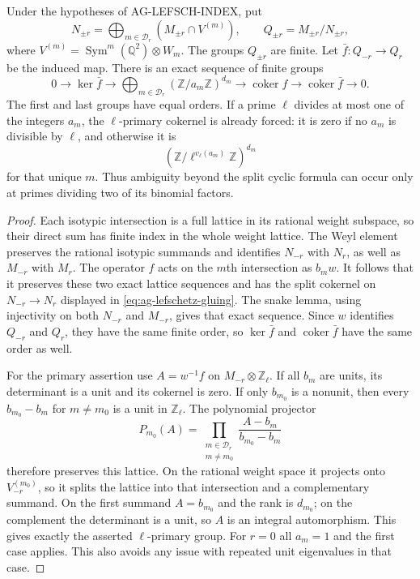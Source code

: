 \begin{proposition}
Under the hypotheses of AG-LEFSCH-INDEX, put
\[
 N_{\pm r}=\bigoplus_{m\in\mathcal D_r}
       (M_{\pm r}\cap V^{(m)}),\qquad
 Q_{\pm r}=M_{\pm r}/N_{\pm r},
\]
where $V^{(m)}=\operatorname{Sym}^m(\mathbb Q^2)\otimes W_m$.
The groups $Q_{\pm r}$ are finite. Let
$\bar f:Q_{-r}\to Q_r$ be the induced map. There is an exact
sequence of finite groups
\begin{equation}\label{eq:ag-lefschetz-gluing}
 0\longrightarrow\ker\bar f
 \longrightarrow\bigoplus_{m\in\mathcal D_r}
        (\mathbb Z/a_m\mathbb Z)^{d_m}
 \longrightarrow\operatorname{coker}f
 \longrightarrow\operatorname{coker}\bar f
 \longrightarrow0.
\end{equation}
The first and last groups have equal orders. If a prime $\ell$
divides at most one of the integers $a_m$, the $\ell$-primary
cokernel is already forced: it is zero if no $a_m$ is divisible
by $\ell$, and otherwise it is
\[
 (\mathbb Z/\ell^{v_\ell(a_m)}\mathbb Z)^{d_m}
\]
for that unique $m$. Thus ambiguity beyond the split cyclic
formula can occur only at primes dividing two of its binomial
factors.
\end{proposition}
\begin{proof}
Each isotypic intersection is a full lattice in its rational
weight subspace, so their direct sum has finite index in the
whole weight lattice. The Weyl element preserves the rational
isotypic summands and identifies $N_{-r}$ with $N_r$, as well
as $M_{-r}$ with $M_r$. The operator $f$ acts on the $m$th
intersection as $b_m w$. It follows that it preserves these
two exact lattice sequences and has the split cokernel on
$N_{-r}\to N_r$ displayed in
\eqref{eq:ag-lefschetz-gluing}. The snake lemma, using
injectivity on both $N_{-r}$ and $M_{-r}$, gives that exact
sequence. Since $w$ identifies $Q_{-r}$ and $Q_r$, they have
the same finite order, so $\ker\bar f$ and
$\operatorname{coker}\bar f$ have the same order as well.

For the primary assertion use $A=w^{-1}f$ on
$M_{-r}\otimes\mathbb Z_\ell$. If all $b_m$ are units,
its determinant is a unit and its cokernel is zero.
If only $b_{m_0}$ is a nonunit, then every
$b_{m_0}-b_m$ for $m\ne m_0$ is a unit in $\mathbb Z_\ell$.
The polynomial projector
\[
 P_{m_0}(A)=\prod_{\substack{m\in\mathcal D_r\\m\ne m_0}}
       \frac{A-b_m}{b_{m_0}-b_m}
\]
therefore preserves this lattice. On the rational weight
space it projects onto $V^{(m_0)}_{-r}$, so it splits the
lattice into that intersection and a complementary summand.
On the first summand $A=b_{m_0}$ and the rank is $d_{m_0}$;
on the complement the determinant is a unit, so $A$ is an
integral automorphism. This gives exactly the asserted
$\ell$-primary group. For $r=0$ all $a_m=1$ and the first
case applies. This also avoids any issue with repeated unit
eigenvalues in that case.
\end{proof}

